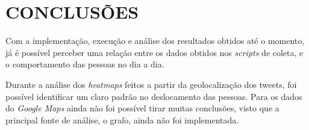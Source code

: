 \section{CONCLUSÕES}
Com a implementação, execução e análise dos resultados obtidos até o momento, já é possível perceber uma relação entre os dados obtidos nos \emph{scripts} de coleta, e o comportamento das pessoas no dia a dia.

Durante a análise dos \emph{heatmaps} feitos a partir da geolocalização dos tweets, foi possível identificar um claro padrão no deslocamento das pessoas. Para os dados do \emph{Google Maps} ainda não foi possível tirar muitas conclusões, visto que a principal fonte de análise, o grafo, ainda não foi implementada.